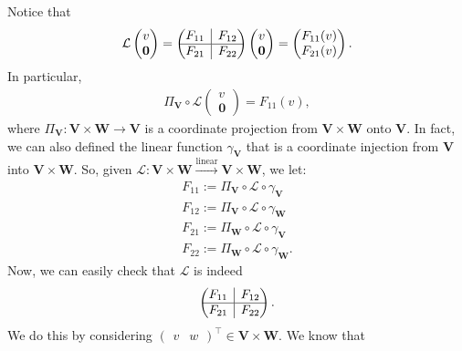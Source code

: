 \documentclass{book}
\theoremstyle{definition}
\newcommand{\V}{\mathbf{V}}
\newcommand{\W}{\mathbf{W}}
\newcommand{\lag}{\mathcal{L}}
\newcommand{\lin}{\overset{\text{linear}}{\longrightarrow}}
\newcommand{\rvline}{\hspace*{-\arraycolsep}\vline\hspace*{-\arraycolsep}}
\begin{document}
Notice that 
\begin{align}
\lag\begin{pmatrix}
v\\\mathbf{0}
\end{pmatrix}
=
\begin{pmatrix}
\begin{matrix}
F_{11}
\end{matrix}
& \rvline & F_{12} \\
\hline
F_{21} & \rvline &
F_{22}
\end{pmatrix}\begin{pmatrix}
v\\\mathbf{0}
\end{pmatrix} = \begin{pmatrix}
F_{11}(v) \\ F_{21}(v)
\end{pmatrix}.
\end{align}
In particular, 
\begin{align}
\Pi_\V \circ \lag \begin{pmatrix}
v \\ \mathbf{0}
\end{pmatrix} = F_{11}(v),
\end{align}
where $\Pi_\V : \V\times \W \to \V$ is a coordinate projection from $\V\times \W$ onto $\V$. In fact, we can also defined the linear function $\gamma_\V$ that is a coordinate injection from $\V$ into $\V\times\W$. So, given $\lag : \V\times \W \lin \V\times \W$, we let:
\begin{align}
F_{11} := \Pi_\V \circ \lag \circ \gamma_\V\\
F_{12} := \Pi_\V \circ \lag \circ \gamma_\W\\
F_{21} := \Pi_\W \circ \lag \circ \gamma_\V\\
F_{22} := \Pi_\W \circ \lag \circ \gamma_\W.
\end{align}
Now, we can easily check that $\lag$ is indeed
\begin{align}
\begin{pmatrix}
\begin{matrix}
F_{11}
\end{matrix}
& \rvline & F_{12} \\
\hline
F_{21} & \rvline &
F_{22}
\end{pmatrix}.
\end{align}
We do this by considering $\begin{pmatrix}
v & w
\end{pmatrix}^\top \in \V \times \W$. We know that
\end{document}
